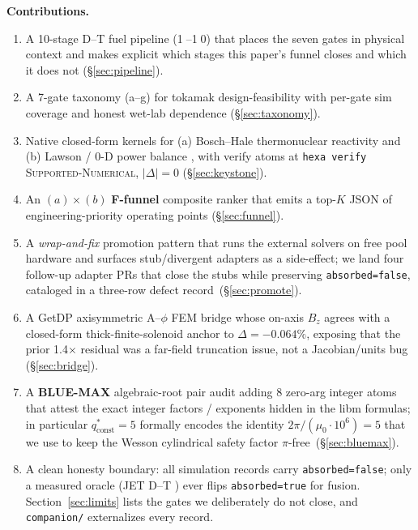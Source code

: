 \documentclass[11pt,a4paper]{article}
\begin{document}
\smallskip\noindent\textbf{Contributions.}
\begin{enumerate}\itemsep0.25em
\item A 10-stage D--T fuel pipeline (\textcircled{\scriptsize 1}--\textcircled{\scriptsize 10})
  that places the seven gates in physical context and makes explicit
  which stages this paper's funnel closes and which it does not
  (\S\ref{sec:pipeline}).
\item A 7-gate taxonomy (a--g) for tokamak design-feasibility with
  per-gate sim coverage and honest wet-lab dependence
  (\S\ref{sec:taxonomy}).
\item Native closed-form kernels for (a) Bosch--Hale
  thermonuclear reactivity \citep{boschhale1992} and (b) Lawson /
  0-D power balance \citep{lawson1957}, with verify atoms at
  \verb|hexa verify| \textsc{Supported-Numerical}, $|\Delta|=0$
  (\S\ref{sec:keystone}).
\item An $(a)\times(b)$ \textbf{F-funnel} composite ranker that emits
  a top-$K$ JSON of engineering-priority operating points
  (\S\ref{sec:funnel}).
\item A \emph{wrap-and-fix} promotion pattern that runs the external
  solvers on free pool hardware and surfaces stub/divergent adapters as
  a side-effect; we land four follow-up adapter PRs that close the
  stubs while preserving \texttt{absorbed=false}, cataloged in a
  three-row defect record~(\S\ref{sec:promote}).
\item A GetDP axisymmetric A--$\phi$ FEM bridge whose on-axis $B_z$
  agrees with a closed-form thick-finite-solenoid anchor to
  $\Delta=-0.064\%$, exposing that the prior 1.4$\times$ residual was a
  far-field truncation issue, not a Jacobian/units bug
  (\S\ref{sec:bridge}).
\item A \textbf{BLUE-MAX} algebraic-root pair audit
  \citep{anthropic2026hexag69} adding 8 zero-arg integer atoms that
  attest the exact integer factors / exponents hidden in the libm
  formulas; in particular $q^{*}_{\text{const}}=5$ formally encodes
  the identity $2\pi/(\mu_0\!\cdot\!10^{6})=5$ that we use to keep the
  Wesson cylindrical safety factor $\pi$-free~(\S\ref{sec:bluemax}).
\item A clean honesty boundary: all simulation records carry
  \texttt{absorbed=false}; only a measured oracle (JET D--T
  \citep{keilhacker1999jet}) ever flips \texttt{absorbed=true} for
  fusion. Section~\ref{sec:limits} lists the gates we deliberately
  do not close, and \texttt{companion/} externalizes every record.
\end{enumerate}
\end{document}
